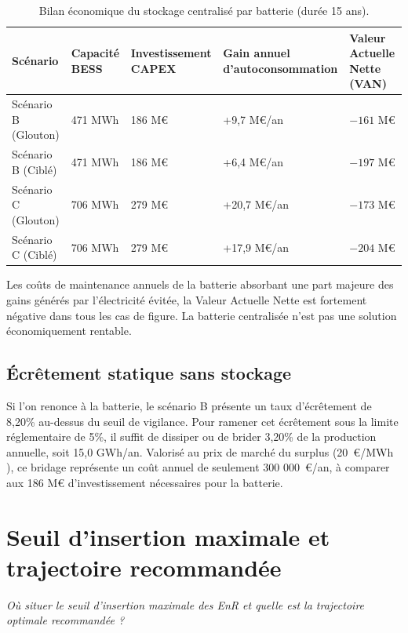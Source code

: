 \documentclass[12pt, a4paper]{report}
\begin{document}
\begin{table}[H]
\centering
\caption{Bilan économique du stockage centralisé par batterie (durée 15 ans).}
\label{tab:van_batterie}
\begin{tabularx}{\textwidth}{lXXXX}
\toprule
Scénario & Capacité BESS & Investissement CAPEX & Gain annuel d'autoconsommation & Valeur Actuelle Nette (VAN) \\
\midrule
Scénario B (Glouton) & 471 MWh & 186 M\euro & +9,7 M\euro/an & $-161$ M\euro \\
Scénario B (Ciblé) & 471 MWh & 186 M\euro & +6,4 M\euro/an & $-197$ M\euro \\
Scénario C (Glouton) & 706 MWh & 279 M\euro & +20,7 M\euro/an & $-173$ M\euro \\
Scénario C (Ciblé) & 706 MWh & 279 M\euro & +17,9 M\euro/an & $-204$ M\euro \\
\bottomrule
\end{tabularx}
\end{table}

Les coûts de maintenance annuels de la batterie absorbant une part majeure des gains générés par l'électricité évitée, la Valeur Actuelle Nette est fortement négative dans tous les cas de figure. La batterie centralisée n'est pas une solution économiquement rentable.

\section{Écrêtement statique sans stockage}

Si l'on renonce à la batterie, le scénario B présente un taux d'écrêtement de 8,20\% au-dessus du seuil de vigilance. Pour ramener cet écrêtement sous la limite réglementaire de 5\%, il suffit de dissiper ou de brider 3,20\% de la production annuelle, soit 15,0 GWh/an. Valorisé au prix de marché du surplus (20~\euro/MWh \cite{cre_trve}), ce bridage représente un coût annuel de seulement 300 000~\euro/an, à comparer aux 186 M\euro{} d'investissement nécessaires pour la batterie.


\chapter{Seuil d'insertion maximale et trajectoire recommandée}

\emph{Où situer le seuil d'insertion maximale des EnR et quelle est la trajectoire optimale recommandée ?}
\end{document}
